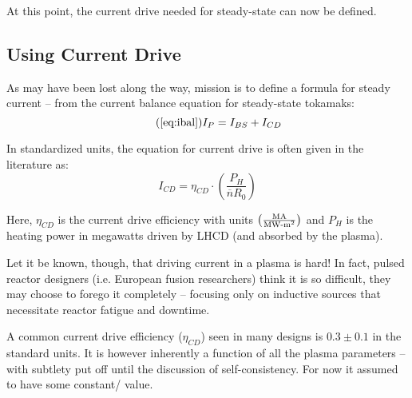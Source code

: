 
At this point, the current drive needed for steady-state can now be defined.

\subsection{Using Current Drive}

As may have been lost along the way,  mission is to define a formula for steady current -- from the current balance equation for steady-state tokamaks:
\begin{equation}
		\tag{\ref{eq:ibal}}
		I_P = I_{BS} + I_{CD}
\end{equation}

In standardized units, the equation for current drive is often given in the literature as: \cite{itercd}
\begin{equation}
	I_{CD} = \eta_{CD} \cdot \left( \frac{P_H}{\overline n R_0} \right)
\end{equation}

Here, $\eta_{CD}$ is the current drive efficiency with units $ \left(
\frac{ \textnormal{MA} }{ \textnormal{MW-m}^2 } \right) $ and $P_H$ is the heating power in megawatts driven by LHCD (and absorbed by the plasma).

Let it be known, though, that driving current in a plasma is hard! In fact, pulsed reactor designers (i.e. European fusion researchers) think it is so difficult, they may choose to forego it completely -- focusing only on inductive sources that necessitate reactor fatigue and downtime. 

A common current drive efficiency ($\eta_{CD}$) seen in many designs is $0.3 \pm 0.1 $ in the standard units. It is however inherently a function of all the plasma parameters -- with subtlety put off until the discussion of self-consistency. For now it assumed to have some constant/ value.


